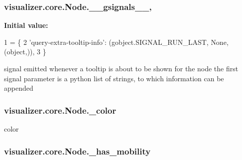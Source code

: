 \subsubsection[{\texorpdfstring{\+\_\+\+\_\+gsignals\+\_\+\+\_\+}{__gsignals__}}]{\setlength{\rightskip}{0pt plus 5cm}visualizer.\+core.\+Node.\+\_\+\+\_\+gsignals\+\_\+\+\_\+\hspace{0.3cm}{\ttfamily [static]}, {\ttfamily [private]}}\hypertarget{classvisualizer_1_1core_1_1Node_a21148e7c1e32ae99855aa58faea3040a}{}\label{classvisualizer_1_1core_1_1Node_a21148e7c1e32ae99855aa58faea3040a}
{\bfseries Initial value\+:}
\begin{DoxyCode}
1 = \{
2         \textcolor{stringliteral}{'query-extra-tooltip-info'}: (gobject.SIGNAL\_RUN\_LAST, \textcolor{keywordtype}{None}, (object,)),
3         \}
\end{DoxyCode}


signal emitted whenever a tooltip is about to be shown for the node the first signal parameter is a python list of strings, to which information can be appended 

\subsubsection[{\texorpdfstring{\+\_\+color}{_color}}]{\setlength{\rightskip}{0pt plus 5cm}visualizer.\+core.\+Node.\+\_\+color\hspace{0.3cm}{\ttfamily [private]}}\hypertarget{classvisualizer_1_1core_1_1Node_aa6fa6cdf104826e54e8ca1358df12f24}{}\label{classvisualizer_1_1core_1_1Node_aa6fa6cdf104826e54e8ca1358df12f24}


color 

\subsubsection[{\texorpdfstring{\+\_\+has\+\_\+mobility}{_has_mobility}}]{\setlength{\rightskip}{0pt plus 5cm}visualizer.\+core.\+Node.\+\_\+has\+\_\+mobility\hspace{0.3cm}{\ttfamily [private]}}\hypertarget{classvisualizer_1_1core_1_1Node_a9aaba352d2aad9fab82bae77f94fa3b0}{}\label{classvisualizer_1_1core_1_1Node_a9aaba352d2aad9fab82bae77f94fa3b0}


